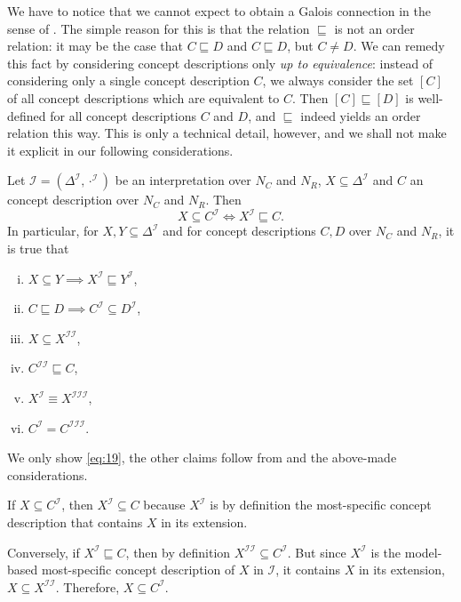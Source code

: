 We have to notice that we cannot expect to obtain a Galois connection in the sense of
.  The simple reason for this is that the relation
$\sqsubseteq$ is not an order relation: it may be the case that $C \sqsubseteq D$ and $C
\sqsubseteq D$, but $C \neq D$.  We can remedy this fact by considering concept
descriptions only \emph{up to equivalence}: instead of considering only a single concept
description $C$, we always consider the set $[C]$ of all concept descriptions which are
equivalent to $C$.  Then $[C] \sqsubseteq [D]$ is well-defined for all concept
descriptions $C$ and $D$, and $\sqsubseteq$ indeed yields an order relation this way.
This is only a technical detail, however, and we shall not make it explicit in our
following considerations.

\begin{Lemma}
  \label{lem:mmsc-and-extension-are-galois-connection}
  Let $\mathcal{I} = (\Delta^{\mathcal{I}}, \cdot^{\mathcal{I}})$ be an interpretation
  over $N_C$ and $N_R$, $X \subseteq \Delta^{\mathcal{I}}$ and $C$ an \ELgfpbot concept
  description over $N_C$ and $N_R$.  Then
  \begin{equation}
    \label{eq:19}
    X \subseteq C^{\mathcal{I}} \iff X^{\mathcal{I}} \sqsubseteq C.
  \end{equation}
  In particular, for $X, Y \subseteq \Delta^{\mathcal{I}}$ and for \ELgfpbot concept
  descriptions $C, D$ over $N_C$ and $N_R$, it is true that
  \begin{enumerate}[i. ]
  \item $X \subseteq Y \implies X^{\mathcal{I}} \sqsubseteq Y^{\mathcal{I}}$,
  \item $C \sqsubseteq D \implies C^{\mathcal{I}} \subseteq D^{\mathcal{I}}$,
  \item $X \subseteq X^{\mathcal{I}\mathcal{I}}$,
  \item $C^{\mathcal{I}\mathcal{I}} \sqsubseteq C$,
  \item $X^{\mathcal{I}} \equiv X^{\mathcal{I}\mathcal{I}\mathcal{I}}$,
  \item $C^{\mathcal{I}} = C^{\mathcal{I}\mathcal{I}\mathcal{I}}$.
  \end{enumerate}
\end{Lemma}
\begin{Proof}
  We only show \eqref{eq:19}, the other claims follow from
   and the above-made considerations.

  If $X \subseteq C^{\mathcal{I}}$, then $X^{\mathcal{I}} \subseteq C$ because
  $X^{\mathcal{I}}$ is by definition the most-specific concept description that contains
  $X$ in its extension.

  Conversely, if $X^{\mathcal{I}} \sqsubseteq C$, then by definition
  $X^{\mathcal{I}\mathcal{I}} \subseteq C^{\mathcal{I}}$.  But since $X^{\mathcal{I}}$ is
  the model-based most-specific concept description of $X$ in $\mathcal{I}$, it contains
  $X$ in its extension, \ie $X \subseteq X^{\mathcal{I}\mathcal{I}}$.  Therefore, $X
  \subseteq C^{\mathcal{I}}$.
\end{Proof}

